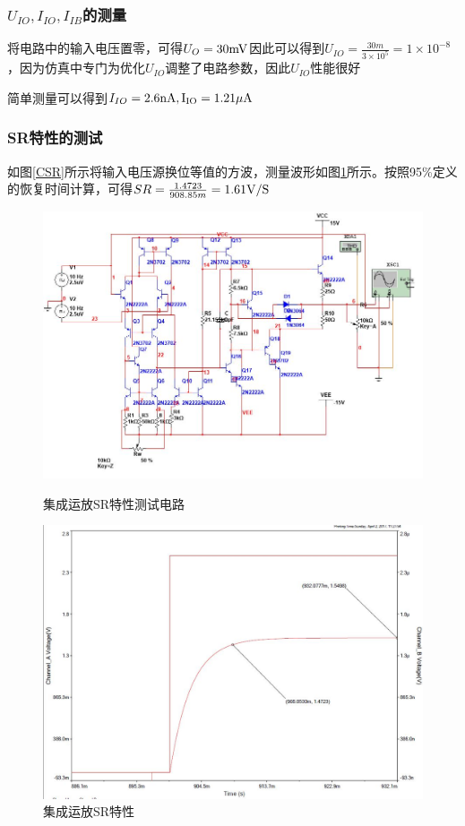 \documentclass[UTF8,a4paper]{ctexart}
\begin{document}
\subsubsection{$U_{IO},I_{IO},I_{IB}$的测量}
将电路中的输入电压置零，可得$U_O=30\rm{mV}$因此可以得到$U_{IO}=\frac{30m}{3\times10^5}=1\times10^{-8}$，因为仿真中专门为优化$U_{IO}$调整了电路参数，因此$U_{IO}$性能很好

简单测量可以得到$I_{IO}=2.6\rm{nA},I_{IO}=1.21\mu\rm{A}$
\subsubsection{SR特性的测试}
如图\ref{CSR}所示将输入电压源换位等值的方波，测量波形如图\ref{SR}所示。按照95\%定义的恢复时间计算，可得$SR=\frac{1.4723}{908.85m}=1.61\rm{V/S}$
\begin{figure}
\centering
\includegraphics[width=\textwidth]{CSR.jpg}
\caption{集成运放SR特性测试电路}
\label{CSR}
\includegraphics[width=\textwidth]{SR.jpg}
\caption{集成运放SR特性}
\label{SR}
\end{figure}
\end{document}
